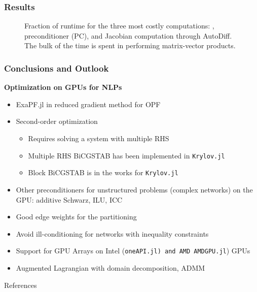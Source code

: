 \begin{frame}[fragile]
  \frametitle{Results}
\begin{figure}
\caption{Fraction of runtime for the three most costly computations: \BiCGSTAB, preconditioner (PC), and Jacobian computation through AutoDiff. The bulk of the time is spent in \BiCGSTAB performing matrix-vector products.}
\label{fig:relperformance}
\end{figure}
\end{frame}


\begin{frame}
  \frametitle{Conclusions and Outlook}
  {\bf Optimization on GPUs for NLPs}
  \begin{itemize}
    \item ExaPF.jl in reduced gradient method for OPF
    \item Second-order optimization 
    \begin{itemize}
      \item Requires solving a system with multiple RHS
      \item Multiple RHS BiCGSTAB has been implemented in \lstinline{Krylov.jl}
      \item Block BiCGSTAB is in the works for \lstinline{Krylov.jl}
    \end{itemize}
    \item Other preconditioners for unstructured problems (complex networks) on the GPU: additive Schwarz, ILU, ICC
    \item Good edge weights for the partitioning
    \item Avoid ill-conditioning for networks with inequality constraints
    \item Support for GPU Arrays on Intel (\lstinline(oneAPI.jl) and AMD (\lstinline{AMDGPU.jl}) GPUs
    \item Augmented Lagrangian with domain decomposition, ADMM
  \end{itemize}
\end{frame}

\begin{frame}{References}
    \printbibliography[heading=none]
\end{frame}



